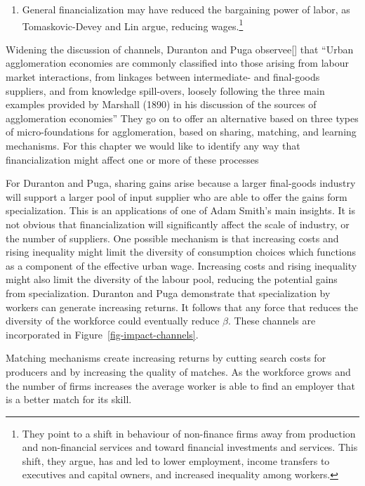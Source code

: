 \begin{enumerate}
\item General financialization may have reduced the bargaining power of labor, as Tomaskovic-Devey and Lin  argue\cite{tomaskovic-deveyFinancializationCausesInequality2013}, reducing wages.\footnote{They point to a shift in behaviour of non-finance firms away from production and non-financial services and toward financial investments and services. This shift, they  argue,  has and led to lower employment, income transfers to executives and capital owners, and increased inequality among workers.\cite{tomaskovic-deveyFinancializationCausesInequality2013}}  

\end{enumerate}



Widening the discussion of channels, Duranton and Puga \cite{durantonMicroFoundationsUrbanAgglomeration2004} observee[] that ``Urban agglomeration economies are commonly classified into those arising from labour market interactions, from linkages between intermediate- and final-goods suppliers, and from knowledge spill-overs, loosely following the three main examples provided by Marshall (1890) in his discussion of the sources of agglomeration economies''  They go on to offer an alternative based on three types of micro-foundations for agglomeration, based on sharing, matching, and learning mechanisms. For this chapter we would like to identify any way that  financialization might affect one or more of these processes 

For Duranton and Puga, sharing gains arise because a larger final-goods industry will support a larger pool of input supplier who are able to offer the gains form specialization. This is an applications of one of Adam Smith's main insights. It is not obvious that financialization will significantly affect the scale of industry, or the number of suppliers.   One possible mechanism is that increasing costs and rising inequality might limit the diversity of consumption choices which functions as a component of the effective urban wage. Increasing costs and rising inequality might also limit the diversity of the labour pool, reducing the potential gains from specialization. Duranton and Puga  demonstrate that specialization by workers can generate increasing returns. It follows that any force that reduces the diversity of the workforce could eventually reduce $\beta$.  These channels are incorporated in Figure~\ref{fig-impact-channels}.

Matching mechanisms create increasing returns by cutting search costs for producers and by increasing the quality of matches. As the workforce grows and the number of firms increases the average worker is able to find an employer that is a better match for its skill. 


